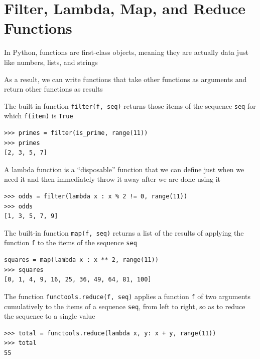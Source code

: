 \documentclass[8pt,a4paper,compress]{beamer}
\begin{document}
\section{Filter, Lambda, Map, and Reduce Functions}
\begin{frame}[fragile]
\pause

In Python, functions are first-class objects, meaning they are actually data just like numbers, lists, and strings

\pause
\bigskip

As a result, we can write functions that take other functions as arguments and return other functions as results

\pause
\bigskip

The built-in function \lstinline{filter(f, seq)} returns those items of the sequence \lstinline{seq} for which \lstinline{f(item)} is \lstinline{True}
\begin{lstlisting}[language={}]
>>> primes = filter(is_prime, range(11))
>>> primes
[2, 3, 5, 7]
\end{lstlisting}

\pause
\bigskip

A lambda function is a ``disposable'' function that we can define just when we need it and then immediately throw it away after we are done using it
\begin{lstlisting}[language={}]
>>> odds = filter(lambda x : x % 2 != 0, range(11))
>>> odds
[1, 3, 5, 7, 9]
\end{lstlisting}
\end{frame}

\begin{frame}[fragile]
\pause

The built-in function \lstinline{map(f, seq)} returns a list of the results of applying the function \lstinline{f} to the items of the sequence \lstinline{seq}
\begin{lstlisting}[language={}]
squares = map(lambda x : x ** 2, range(11))
>>> squares
[0, 1, 4, 9, 16, 25, 36, 49, 64, 81, 100]
\end{lstlisting}

\pause
\bigskip

The function \lstinline{functools.reduce(f, seq)} applies a function \lstinline{f} of two arguments cumulatively to the items of a sequence \lstinline{seq}, from left to right, so as to reduce the sequence to a single value
\begin{lstlisting}[language={}]
>>> total = functools.reduce(lambda x, y: x + y, range(11))
>>> total
55
\end{lstlisting}
\end{frame}
\end{document}
